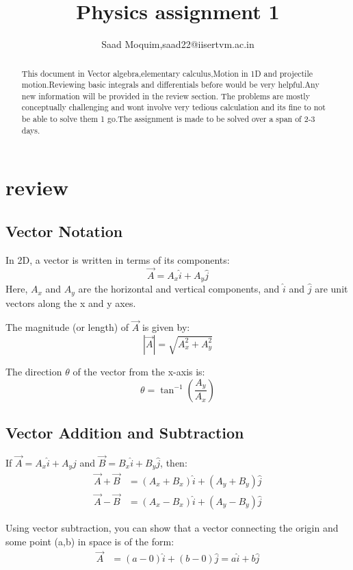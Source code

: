 \documentclass[12pt]{article}
\title{\textbf{Physics assignment 1}}
\author{Saad Moquim,saad22@iisertvm.ac.in}
\date{}
\begin{document}
\begin{abstract}
    This document in Vector algebra,elementary calculus,Motion in 1D and projectile motion.Reviewing basic integrals and differentials before would be very helpful.Any new information will be provided in the review section.
    The problems are mostly conceptually challenging and wont involve very tedious calculation and its fine to not be able to solve them 1 go.The assignment is made to be solved over a span of 2-3 days.
\end{abstract}
\maketitle
\section{review}
\subsection*{Vector Notation}
In 2D, a vector is written in terms of its components:
\[
\vec{A} = A_x \hat{i} + A_y \hat{j}
\]
Here, \( A_x \) and \( A_y \) are the horizontal and vertical components, and \( \hat{i} \) and \( \hat{j} \) are unit vectors along the x and y axes.

The magnitude (or length) of \( \vec{A} \) is given by:
\[
|\vec{A}| = \sqrt{A_x^2 + A_y^2}
\]

The direction \( \theta \) of the vector from the x-axis is:
\[
\theta = \tan^{-1}\left(\frac{A_y}{A_x}\right)
\]

\subsection*{Vector Addition and Subtraction}
If \( \vec{A} = A_x \hat{i} + A_y \hat{j} \) and \( \vec{B} = B_x \hat{i} + B_y \hat{j} \), then:
\begin{align*}
\vec{A} + \vec{B} &= (A_x + B_x)\hat{i} + (A_y + B_y)\hat{j} \\
\vec{A} - \vec{B} &= (A_x - B_x)\hat{i} + (A_y - B_y)\hat{j}
\end{align*}

Using vector subtraction, you can show that a vector connecting the origin and some point (a,b) in space is of the form:
\begin{align*}
\vec{A}  &= (a - 0)\hat{i} + (b - 0)\hat{j} =a\hat{i} + b\hat{j}
\end{align*}
\end{document}
